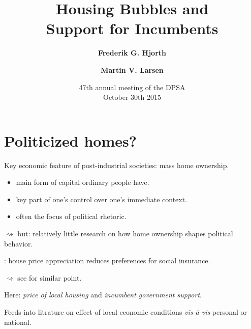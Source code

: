 \documentclass[aspectratio=169]{beamer}
\title[Housing bubbles]{Housing Bubbles and \\Support for Incumbents}
\author{\textbf{Frederik G. Hjorth} \and \textbf{Martin V. Larsen}}
\institute[UCPH]{\small Department of Political Science \\ University of Copenhagen}
\date[October 2015]{ 47th annual meeting of the DPSA \\ October 30th 2015}
\begin{document}
	
	\begin{frame}
		\titlepage
	\end{frame}
	
	
	\AtBeginSection[]{\begin{frame}{Outline}
			\tableofcontents[currentsection] 
		\end{frame}}
	
\section{Politicized homes?}

	\begin{frame}
	Key economic feature of post-industrial societies: mass home ownership.
	
	\vspace{0.2in} 

	\begin{itemize}[<+->]
		\item main form of capital ordinary people have.
		\item key part of one's control over one's immediate context.
		\item often the focus of political rhetoric.
	\end{itemize}
	
		\vspace{0.2in} \pause
		
	$\rightsquigarrow$ but: relatively little research on how home ownership shapes political behavior.
		\end{frame}	
	
		\begin{frame}
		\citet{ansell2014political}: house price appreciation reduces preferences for social insurance. 
		
		$\rightsquigarrow$ see  \citet{di2007formation} for similar point.
						
		\vspace{0.3in}	\pause
						
		Here: \emph{price of local housing} and \emph{incumbent government support}.					
		
		\vspace{0.3in} \pause	
		
		Feeds into litrature on effect of local economic conditions \textit{vis-à-vis} personal or national.
       			
		\end{frame}	
		
\end{document}
